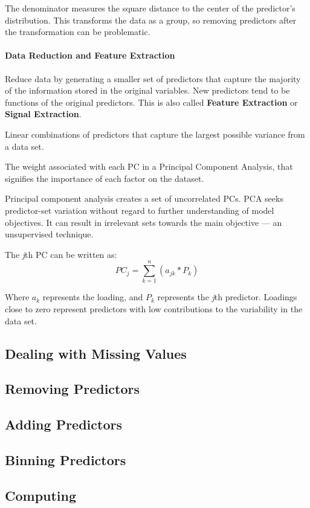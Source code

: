 \documentclass[../main.tex]{subfiles}
\begin{document}
    The denominator measures the square distance to the center of the predictor's distribution. This 
    transforms the data as a group, so removing predictors after the transformation can be problematic.

    \paragraph{Data Reduction and Feature Extraction}
    \begin{definition}
        Reduce data by generating a smaller set of predictors that capture the majority of the information stored in the original variables.
        New predictors tend to be functions of the original predictors. This is also called \textbf{Feature Extraction} or \textbf{Signal Extraction}.
    \end{definition}

    \begin{definition}
        Linear combinations of predictors that capture the largest possible variance from a data set.
    \end{definition}
    \begin{definition}[Loading]
        The weight associated with each PC in a Principal Component Analysis, that signifies the importance of each factor on the dataset. 
    \end{definition}
    \begin{definition}
        Principal component analysis creates a set of uncorrelated PCs. PCA seeks predictor-set variation without regard to further understanding of model objectives.
        It can result in irrelevant sets towards the main objective --- an unsupervised technique.    
    \end{definition}

    
    The \textit{j}th PC can be written as:
    \[PC_j = \sum_{k=1}^{n}(a_{jk}*P_k) \]

    Where $ a_k $ represents the loading, and $ P_k $ represents the \textit{j}th predictor.
    Loadings close to zero represent predictors with low contributions to the variability in the data set.
    

\subsection{Dealing with Missing Values}






\subsection{Removing Predictors}

\subsection{Adding Predictors}
    
\subsection{Binning Predictors}
    
\subsection{Computing}
\end{document}
